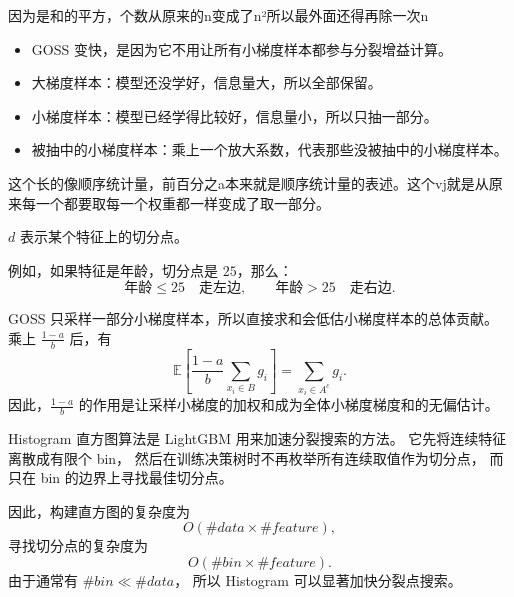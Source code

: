 \begin{dxtips}
    因为是和的平方，个数从原来的n变成了n²所以最外面还得再除一次n
\end{dxtips}
\begin{dxtips}
   \begin{itemize}
    \item GOSS 变快，是因为它不用让所有小梯度样本都参与分裂增益计算。
    
    \item 大梯度样本：模型还没学好，信息量大，所以全部保留。
    
    \item 小梯度样本：模型已经学得比较好，信息量小，所以只抽一部分。
    
    \item 被抽中的小梯度样本：乘上一个放大系数，代表那些没被抽中的小梯度样本。
\end{itemize}
\end{dxtips}
\begin{note}
    这个长的像顺序统计量，前百分之a本来就是顺序统计量的表述。这个vj就是从原来每一个都要取每一个权重都一样变成了取一部分。
\end{note}
\begin{example}
    

$d$ 表示某个特征上的切分点。

例如，如果特征是年龄，切分点是 $25$，那么：
\[
\text{年龄} \le 25 \quad \text{走左边},
\qquad
\text{年龄} > 25 \quad \text{走右边}.
\]
\end{example}


\begin{dxtips}
GOSS 只采样一部分小梯度样本，所以直接求和会低估小梯度样本的总体贡献。
乘上 $\frac{1-a}{b}$ 后，有
\[
\mathbb{E}\left[
\frac{1-a}{b}
\sum_{x_i\in B} g_i
\right]
=
\sum_{x_i\in A^c} g_i.
\]
因此，$\frac{1-a}{b}$ 的作用是让采样小梯度的加权和成为全体小梯度梯度和的无偏估计。

\end{dxtips}
\begin{definition}
Histogram 直方图算法是 LightGBM 用来加速分裂搜索的方法。
它先将连续特征离散成有限个 bin，
然后在训练决策树时不再枚举所有连续取值作为切分点，
而只在 bin 的边界上寻找最佳切分点。

因此，构建直方图的复杂度为
\[
O(\#data \times \#feature),
\]
寻找切分点的复杂度为
\[
O(\#bin \times \#feature).
\]
由于通常有 $\#bin \ll \#data$，
所以 Histogram 可以显著加快分裂点搜索。
\end{definition}

